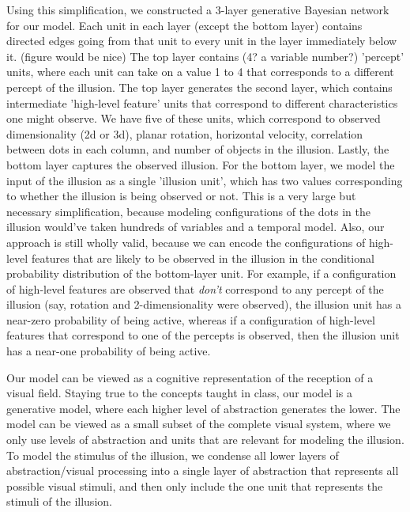 \documentclass{article} %
\begin{document}
Using this simplification, we constructed a 3-layer generative Bayesian network for our model. Each unit in each layer (except the bottom layer) contains directed edges going from that unit to every unit in the layer immediately below it. (figure would be nice) The top layer contains (4? a variable number?) 'percept' units, where each unit can take on a value 1 to 4 that corresponds to a different percept of the illusion. The top layer generates the second layer, which contains intermediate 'high-level feature' units that correspond to different characteristics one might observe. We have five of these units, which correspond to observed dimensionality (2d or 3d), planar rotation, horizontal velocity, correlation between dots in each column, and number of objects in the illusion. Lastly, the bottom layer captures the observed illusion. For the bottom layer, we model the input of the illusion as a single 'illusion unit', which has two values corresponding to whether the illusion is being observed or not. This is a very large but necessary simplification, because modeling configurations of the dots in the illusion would've taken hundreds of variables and a temporal model. Also, our approach is still wholly valid, because we can encode the configurations of high-level features that are likely to be observed in the illusion in the conditional probability distribution of the bottom-layer unit. For example, if a configuration of high-level features are observed that \emph{don't} correspond to any percept of the illusion (say, rotation and 2-dimensionality were observed), the illusion unit has a near-zero probability of being active, whereas if a configuration of high-level features that correspond to one of the percepts is observed, then the illusion unit has a near-one probability of being active.

Our model can be viewed as a cognitive representation of the reception of a visual field. Staying true to the concepts taught in class, our model is a generative model, where each higher level of abstraction generates the lower. The model can be viewed as a small subset of the complete visual system, where we only use levels of abstraction and units that are relevant for modeling the illusion. To model the stimulus of the illusion, we condense all lower layers of abstraction/visual processing into a single layer of abstraction that represents all possible visual stimuli, and then only include the one unit that represents the stimuli of the illusion. 
\end{document}
